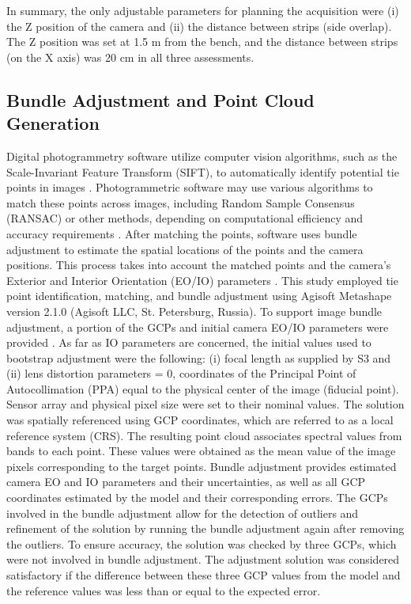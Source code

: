 \documentclass[12pt,a4paper,oneside]{report}
\begin{document}
In summary, the only adjustable parameters for planning the acquisition were (i) the Z position of the camera and (ii) the distance between strips (side overlap). The Z position was set at 1.5 m from the bench, and the distance between strips (on the X axis) was 20 cm in all three assessments.

\subsection{Bundle Adjustment and Point Cloud Generation}

Digital photogrammetry software utilize computer vision algorithms, such as the Scale-Invariant Feature Transform (SIFT), to automatically identify potential tie points in images
\cite{oteroAnatomySIFTMethod2014,loweDistinctiveImageFeatures2004,loweObjectRecognitionLocal1999}.
Photogrammetric software may use various algorithms to match these points across images, including Random Sample Consensus (RANSAC) or other methods, depending on computational efficiency and accuracy requirements
\cite{FASTAPPROXIMATENEAREST2009}.
After matching the points, software uses bundle adjustment to estimate the spatial locations of the points and the camera positions. This process takes into account the matched points and the camera’s Exterior and Interior Orientation (EO/IO) parameters
\cite{krausPhotogrammetryGeometryImages2011,hartleyMultipleViewGeometry2004,gomarascaElementsPhotogrammetry2009}.
This study employed tie point identification, matching, and bundle adjustment using Agisoft Metashape version 2.1.0 (Agisoft LLC, St. Petersburg, Russia). To support image bundle adjustment, a portion of the GCPs and initial camera EO/IO parameters were provided
\cite{atkinsonCloseRangePhotogrammetry1996,triggsBundleAdjustmentModern2000,moulonPositionnementRobustePrecis}.
As far as IO parameters are concerned, the initial values used to bootstrap adjustment were the following: (i) focal length as supplied by S3 and (ii) lens distortion parameters = 0, coordinates of the Principal Point of Autocollimation (PPA) equal to the physical center of the image (fiducial point). Sensor array and physical pixel size were set to their nominal values.
The solution was spatially referenced using GCP coordinates, which are referred to as a local reference system (CRS). The resulting point cloud associates spectral values from bands to each point. These values were obtained as the mean value of the image pixels corresponding to the target points. Bundle adjustment provides estimated camera EO and IO parameters and their uncertainties, as well as all GCP coordinates estimated by the model and their corresponding errors. The GCPs involved in the bundle adjustment allow for the detection of outliers and refinement of the solution by running the bundle adjustment again after removing the outliers.
To ensure accuracy, the solution was checked by three GCPs, which were not involved in bundle adjustment. The adjustment solution was considered satisfactory if the difference between these three GCP values from the model and the reference values was less than or equal to the expected error.
\end{document}

